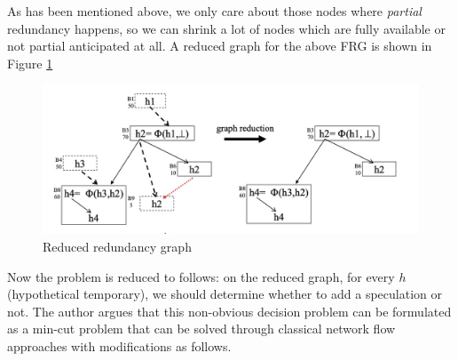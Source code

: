 \begin{exercise}[]
\begin{solution}
  As has been mentioned above, we only care about those nodes where \textit{partial} redundancy happens, so we can shrink a lot of nodes which are fully available or not partial anticipated at all. A reduced graph for the above FRG is shown in Figure \ref{red}

  \begin{figure}
    \centering
    \includegraphics[width=12cm]{img/ex6-red.jpg}
    \caption{Reduced redundancy graph}
    \label{red}
  \end{figure}

  Now the problem is reduced to follows: on the reduced graph, for every $h$ (hypothetical temporary), we should determine whether to add a speculation or not. The author argues that this non-obvious decision problem can be formulated as a min-cut problem that can be solved through classical network flow approaches with modifications as follows.


\end{solution}
\end{exercise}
